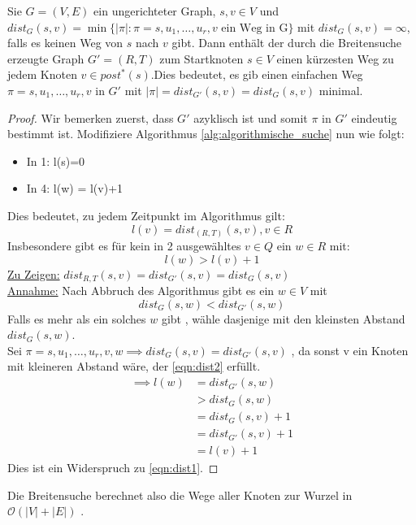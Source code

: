 \begin{theorem}
	Sie $G=(V,E)$ ein ungerichteter Graph, $s,v \in V$ und \\ $dist_G(s,v)= \min \{|\pi| : \pi = s,u_1,\ldots,u_r,v \text{ ein Weg in G}\}$ mit $dist_G(s,v) = \infty $, falls es keinen Weg von $s$ nach $v$ gibt. 
Dann enthält der durch die Breitensuche erzeugte Graph $G'=(R,T)$ zum Startknoten $s \in V$ einen kürzesten Weg zu jedem Knoten $v \in  post^{*}(s)$.Dies bedeutet, es gib einen einfachen Weg $\pi=s,u_1,\ldots,u_r,v$ in $G'$ mit $|\pi|= dist_{G'}(s,v)= dist_G(s,v)$ minimal.
\end{theorem}
\begin{proof}
Wir bemerken zuerst, dass $G'$ azyklisch ist und somit $\pi$ in $G'$ eindeutig bestimmt ist.
Modifiziere Algorithmus \ref{alg:algorithmische_suche} nun wie folgt:
\begin{itemize}
	\item In 1: l(s)=0
	\item In 4: l(w) = l(v)+1
\end{itemize}
Dies bedeutet, zu jedem Zeitpunkt im Algorithmus gilt:
\[
l(v)=dist_{(R,T)} (s,v) , v \in R
\]
Insbesondere gibt es für kein in 2 ausgewähltes $v \in  Q$ ein $w \in R$ mit:
\begin{equation}
	\label{eqn:dist1}
l(w)> l(v)+1
\end{equation}
\underline{Zu Zeigen:} $dist_{R,T} (s,v) = dist_{G'} (s,v) = dist_G (s,v)$ \\
\underline{Annahme:} Nach Abbruch des Algorithmus gibt es ein $w \in V$ mit 
\begin{equation}
\label{eqn:dist2}
dist_G(s,w) < dist_{G'} (s,w)
\end{equation}
Falls es mehr als ein solches $w$  gibt , wähle dasjenige mit den kleinsten Abstand 
$dist_G(s,w)$.\\
Sei $\pi=s,u_1,\ldots,u_r,v,w \implies dist_G(s,v) = dist_{G'} (s,v)$ , da sonst v ein Knoten mit kleineren Abstand wäre, der \eqref{eqn:dist2} erfüllt.
\begin{align*}
	\implies l(w) &= dist_{G'}(s,w) \\
		      &> dist_G(s,w) \\
		      &= dist_G (s,v) +1 \\
		      &= dist_{G'} (s,v)+1 \\
		      &=l(v) +1
\end{align*}
Dies ist ein Widerspruch zu \eqref{eqn:dist1}.
\end{proof}
\begin{remark}
Die Breitensuche berechnet also die Wege aller Knoten zur Wurzel in $\mathcal{O}(|V|+|E|)$ .
\end{remark}
